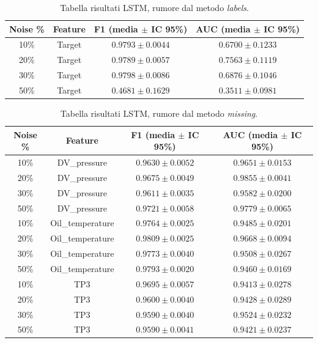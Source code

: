 \documentclass[../main.tex]{subfiles}
\begin{document}
\begin{table}[H]
\centering\small
{}
\begin{tabular}{cccc}
\toprule
\textbf{Noise \%} & \textbf{Feature} & \textbf{F1 (media $\pm$ IC 95\%)} & \textbf{AUC (media $\pm$ IC 95\%)} \\
\midrule
10\% & Target & $0.9793 \pm 0.0044$ & $0.6700 \pm 0.1233$ \\
20\% & Target & $0.9789 \pm 0.0057$ & $0.7563 \pm 0.1119$ \\
30\% & Target & $0.9798 \pm 0.0086$ & $0.6876 \pm 0.1046$ \\
50\% & Target & $\mathbf{0.4681 \pm 0.1629}$ & $\mathbf{0.3511 \pm 0.0981}$ \\
\bottomrule
\end{tabular}
\caption{Tabella risultati LSTM, rumore dal metodo \textit{labels}.}
\label{tab:lstm_labels}
\end{table}

\begin{table}[H]
\centering\small
{}
\begin{tabular}{cccc}
\toprule
\textbf{Noise \%} & \textbf{Feature} & \textbf{F1 (media $\pm$ IC 95\%)} & \textbf{AUC (media $\pm$ IC 95\%)} \\
\midrule
10\% & DV\_pressure     & $0.9630 \pm 0.0052$ & $0.9651 \pm 0.0153$ \\
20\% & DV\_pressure     & $0.9675 \pm 0.0049$ & $0.9855 \pm 0.0041$ \\
30\% & DV\_pressure     & $0.9611 \pm 0.0035$ & $0.9582 \pm 0.0200$ \\
50\% & DV\_pressure     & $0.9721 \pm 0.0058$ & $0.9779 \pm 0.0065$ \\
\midrule
10\% & Oil\_temperature & $0.9764 \pm 0.0025$ & $0.9485 \pm 0.0201$ \\
20\% & Oil\_temperature & $0.9809 \pm 0.0025$ & $0.9668 \pm 0.0094$ \\
30\% & Oil\_temperature & $0.9773 \pm 0.0040$ & $0.9508 \pm 0.0267$ \\
50\% & Oil\_temperature & $0.9793 \pm 0.0020$ & $0.9460 \pm 0.0169$ \\
\midrule
10\% & TP3             & $0.9695 \pm 0.0057$ & $0.9413 \pm 0.0278$ \\
20\% & TP3             & $0.9600 \pm 0.0040$ & $0.9428 \pm 0.0289$ \\
30\% & TP3             & $0.9590 \pm 0.0040$ & $0.9524 \pm 0.0232$ \\
50\% & TP3             & $0.9590 \pm 0.0041$ & $0.9421 \pm 0.0237$ \\
\bottomrule
\end{tabular}
\caption{Tabella risultati LSTM, rumore dal metodo \textit{missing}.}
\label{tab:lstm_missing}
\end{table}
\end{document}
